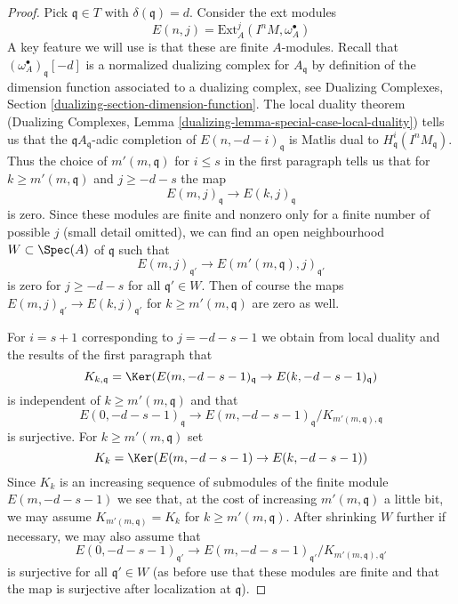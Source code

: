 \begin{proof}
\medskip\noindent
Pick $\mathfrak q \in T$ with $\delta(\mathfrak q) = d$.
Consider the ext modules
$$
E(n, j) = \text{Ext}^j_A(I^nM, \omega_A^\bullet)
$$
A key feature we will use is that these are finite $A$-modules.
Recall that $(\omega_A^\bullet)_\mathfrak q[-d]$ is a normalized
dualizing complex for $A_\mathfrak q$ by definition of the
dimension function associated to a dualizing complex, see
Dualizing Complexes, Section \ref{dualizing-section-dimension-function}.
The local duality theorem (Dualizing Complexes, Lemma
\ref{dualizing-lemma-special-case-local-duality}) tells us that
the $\mathfrak qA_\mathfrak q$-adic completion of
$E(n, -d - i)_\mathfrak q$ is Matlis dual to
$H^i_\mathfrak q(I^nM_\mathfrak q)$. Thus the choice of
$m'(m, \mathfrak q)$ for $i \leq s$ in the first paragraph tells us that
for $k \geq m'(m, \mathfrak q)$ and $j \geq -d - s$ the map
$$
E(m, j)_\mathfrak q \to E(k, j)_\mathfrak q
$$
is zero. Since these modules are finite and nonzero only
for a finite number of possible $j$ (small detail omitted),
we can find an open neighbourhood $W \subset \Spec(A)$ of $\mathfrak q$
such that
$$
E(m, j)_{\mathfrak q'} \to E(m'(m, \mathfrak q), j)_{\mathfrak q'}
$$
is zero for $j \geq -d - s$ for all $\mathfrak q' \in W$.
Then of course the maps $E(m, j)_{\mathfrak q'} \to E(k, j)_{\mathfrak q'}$
for $k \geq m'(m, \mathfrak q)$ are zero as well.

\medskip\noindent
For $i = s + 1$ corresponding to $j = - d - s - 1$ we obtain
from local duality and the results of the first paragraph that
$$
K_{k, \mathfrak q} =
\Ker(E(m, -d - s - 1)_\mathfrak q \to E(k, -d - s - 1)_\mathfrak q)
$$
is independent of $k \geq m'(m, \mathfrak q)$ and that
$$
E(0, -d - s - 1)_\mathfrak q \to
E(m, -d - s - 1)_\mathfrak q/K_{m'(m, \mathfrak q), \mathfrak q}
$$
is surjective. For $k \geq m'(m, \mathfrak q)$ set
$$
K_k = \Ker(E(m, -d - s - 1) \to E(k, -d - s - 1))
$$
Since $K_k$ is an increasing sequence of submodules of the finite
module $E(m, -d - s - 1)$ we see that, at the cost of increasing
$m'(m, \mathfrak q)$ a little bit, we may assume
$K_{m'(m, \mathfrak q)} = K_k$ for $k \geq m'(m, \mathfrak q)$.
After shrinking $W$ further if necessary, we may also assume that
$$
E(0, -d - s - 1)_{\mathfrak q'} \to
E(m, -d - s - 1)_{\mathfrak q'}/K_{m'(m, \mathfrak q), \mathfrak q'}
$$
is surjective for all $\mathfrak q' \in W$ (as before use that
these modules are finite
and that the map is surjective after localization at $\mathfrak q$).


\end{proof}
